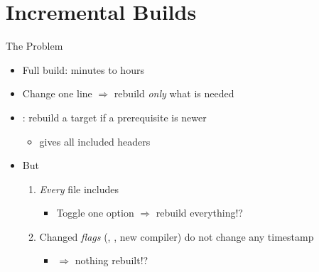 
\section{Incremental Builds}
\frame{\sectionpage}

\begin{frame}{The Problem}

  \begin{itemize}[<+->]
    \item Full build: minutes to hours
    \item Change one line $\Rightarrow$ rebuild \emph{only} what is needed
    \item {}: rebuild a target if a prerequisite is newer
      \begin{itemize}[<.->]
	\item {} gives all included headers
      \end{itemize}
    \item But
      \begin{enumerate}
	\item \emph{Every} file includes 
	  \begin{itemize}[<.->]
	    \item Toggle one option $\Rightarrow$ rebuild everything!?
	  \end{itemize}
	\item Changed \emph{flags} (, , new
	  compiler) do not change any timestamp
	  \begin{itemize}[<.->]
	    \item $\Rightarrow$ nothing rebuilt!?
	  \end{itemize}
      \end{enumerate}
  \end{itemize}

\end{frame}

